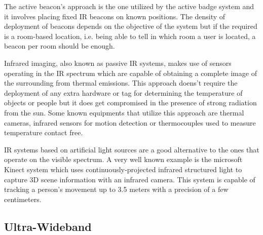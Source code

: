 The active beacon's approach is the one utilized by the active badge system and it involves placing fixed \ac{IR} beacons on known positions. The density of deployment of beacons depends on the objective of the system but if the required is a room-based location, i.e. being able to tell in which room a user is located, a beacon per room should be enough.

Infrared imaging, also known as passive \ac{IR} systems, makes use of sensors operating in the \ac{IR} spectrum which are capable of obtaining a complete image of the surrounding from thermal emissions. This approach doens't require the deployment of any extra hardware or tag for determining the temperature of objects or people but it does get compromised in the presence of strong radiation from the sun. Some known equipments that utilize this approach are thermal cameras, infrared sensors for motion detection or thermocouples used to measure temperature contact free. 

\ac{IR} systems based on artificial light sources are a good alternative to the ones that operate on the visible spectrum. A very well known example is the microsoft Kinect system which uses continuously‐projected infrared structured light to capture 3D scene information	with an	infrared camera. This system is capable of tracking a person's movement up to 3.5 meters with a precision of a few centimeters. 


\subsection{Ultra-Wideband}
\label{subsec:uwb}

